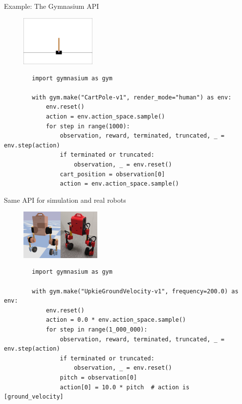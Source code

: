 \documentclass[10pt, aspectratio=1610]{beamer}
\begin{document}
\begin{frame}[fragile]{Example: The Gymnasium API}
    \begin{figure}
        \includegraphics[height=2.5cm]{figures/cart-pole.png}
    \end{figure}
    \begin{verbatim}
        import gymnasium as gym

        with gym.make("CartPole-v1", render_mode="human") as env:
            env.reset()
            action = env.action_space.sample()
            for step in range(1000):
                observation, reward, terminated, truncated, _ = env.step(action)
                if terminated or truncated:
                    observation, _ = env.reset()
                cart_position = observation[0]
                action = env.action_space.sample()
    \end{verbatim}
\end{frame}

\begin{frame}[fragile]{Same API for simulation and real robots}
    \begin{figure}
        \includegraphics[height=2.5cm]{figures/upkie-sim-real.png}
    \end{figure}
    \begin{verbatim}
        import gymnasium as gym

        with gym.make("UpkieGroundVelocity-v1", frequency=200.0) as env:
            env.reset()
            action = 0.0 * env.action_space.sample()
            for step in range(1_000_000):
                observation, reward, terminated, truncated, _ = env.step(action)
                if terminated or truncated:
                    observation, _ = env.reset()
                pitch = observation[0]
                action[0] = 10.0 * pitch  # action is [ground_velocity]
    \end{verbatim}
\end{frame}
\end{document}
